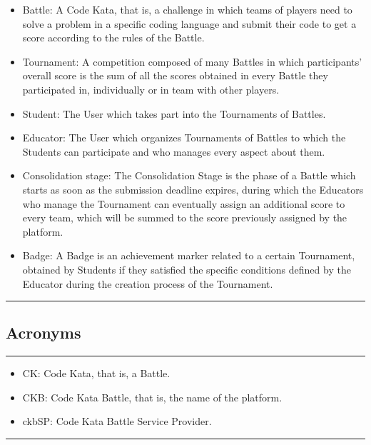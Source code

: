 \documentclass{Configuration_Files/Template}
\begin{document}
\begin{itemize}
\item \textcolor{bluepoli}{Battle:} A Code Kata, that is, a challenge in which teams of players need to solve a problem in a specific coding language and submit their code to get a score according to the rules of the Battle.
\item \textcolor{bluepoli}{Tournament:} A competition composed of many Battles in which participants' overall score is the sum of all the scores obtained in every Battle they participated in, individually or in team with other players.
\item \textcolor{bluepoli}{Student:} The User which takes part into the Tournaments of Battles.
\item \textcolor{bluepoli}{Educator:} The User which organizes Tournaments of Battles to which the Students can participate and who manages every aspect about them.
\item \textcolor{bluepoli}{Consolidation stage:} The Consolidation Stage is the phase of a Battle which starts as soon as the submission deadline expires, during which the Educators who manage the Tournament can eventually assign an additional score to every team, which will be summed to the score previously assigned by the platform.
\item \textcolor{bluepoli}{Badge:} A Badge is an achievement marker related to a certain Tournament, obtained by Students if they satisfied the specific conditions defined by the Educator during the creation process of the Tournament.
\end{itemize}

{\color{bluepoli}\rule{\linewidth}{0.1pt}}

\subsection{Acronyms}

{\color{bluepoli}\rule{\linewidth}{0.1pt}}

\begin{itemize}
\item \textcolor{bluepoli}{CK:} Code Kata, that is, a Battle.
\item \textcolor{bluepoli}{CKB:} Code Kata Battle, that is, the name of the platform.
\item \textcolor{bluepoli}{ckbSP:} Code Kata Battle Service Provider.
\end{itemize}

{\color{bluepoli}\rule{\linewidth}{0.1pt}}
\end{document}
